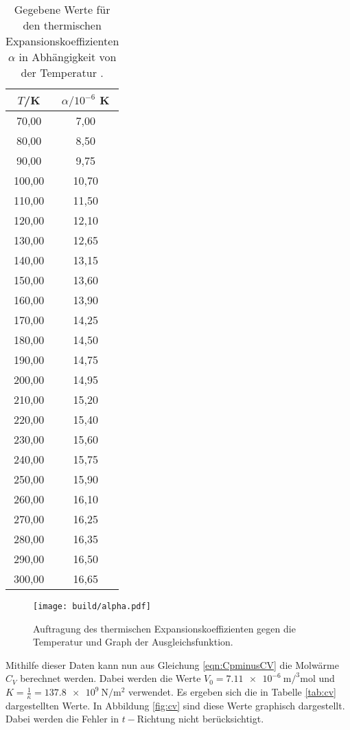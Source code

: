 \begin{table}[htp]
	\begin{center}
    \caption{Gegebene Werte für den thermischen Expansionskoeffizienten $\alpha$ in Abhängigkeit von der
    Temperatur \cite{versuchsanleitung}.}
    \label{tab:alpha}
		\begin{tabular}{cc}
		\toprule
			{$T$/K} & {$\alpha/10^{-6}$ K}\\
			\midrule
			70,00 & 7,00\\
			80,00 & 8,50\\
			90,00 & 9,75\\
			100,00 & 10,70\\
			110,00 & 11,50\\
			120,00 & 12,10\\
			130,00 & 12,65\\
			140,00 & 13,15\\
			150,00 & 13,60\\
			160,00 & 13,90\\
			170,00 & 14,25\\
			180,00 & 14,50\\
			190,00 & 14,75\\
			200,00 & 14,95\\
			210,00 & 15,20\\
			220,00 & 15,40\\
			230,00 & 15,60\\
			240,00 & 15,75\\
			250,00 & 15,90\\
			260,00 & 16,10\\
			270,00 & 16,25\\
			280,00 & 16,35\\
			290,00 & 16,50\\
			300,00 & 16,65\\
		\bottomrule
		\end{tabular}
	\end{center}
\end{table}

\begin{figure}
  \centering
  \texttt{[image: build/alpha.pdf]}
  \caption{Auftragung des thermischen Expansionskoeffizienten gegen die Temperatur und Graph der
  Ausgleichsfunktion.}
  \label{fig:alpha}
\end{figure}

Mithilfe dieser Daten kann nun aus Gleichung \eqref{eqn:CpminusCV} die Molwärme $C_V$
berechnet werden. Dabei werden die Werte $V_0=\SI{7.11e-6}{\metre\cubic\per\mole}$
\cite{molvolumen} und $K=\frac{1}{\kappa}=\SI{137.8e9}{\newton\per\metre\squared}$
\cite{kompressionsmodul} verwendet. Es ergeben sich die
in Tabelle \ref{tab:cv} dargestellten Werte. In Abbildung \ref{fig:cv} sind diese Werte
graphisch dargestellt. Dabei werden die Fehler in $t-$Richtung nicht berücksichtigt.

